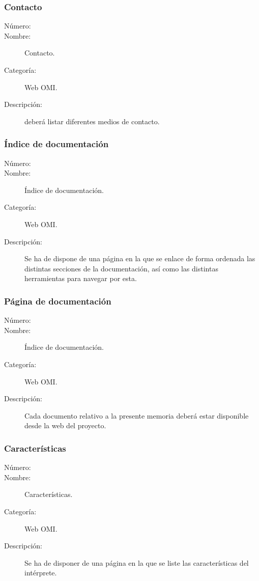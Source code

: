 \subsubsection{Contacto}
\begin{framed}
	\begin{description}
		\item [Número:] \cn
		\item [Nombre:] Contacto.
		\item [Categoría:] Web OMI.
		\item [Descripción:] deberá listar diferentes medios de contacto. 
	\end {description}
\end{framed}

\subsubsection{Índice de documentación}
\begin{framed}
	\begin{description}
		\item [Número:] \cn
		\item [Nombre:] Índice de documentación.
		\item [Categoría:] Web OMI.
		\item [Descripción:]  Se ha de dispone de una página en la que se enlace de forma ordenada las distintas secciones de la 
      documentación, así como las distintas herramientas para navegar por esta.
	\end {description}
\end{framed}

\subsubsection{Página de documentación}
\begin{framed}
	\begin{description}
		\item [Número:] \cn
		\item [Nombre:] Índice de documentación.
		\item [Categoría:] Web OMI.
		\item [Descripción:]  Cada documento relativo a la presente memoria deberá estar disponible desde la web del proyecto.
	\end {description}
\end{framed}

\subsubsection{Características}
\begin{framed}
	\begin{description}
		\item [Número:] \cn
		\item [Nombre:] Características.
		\item [Categoría:] Web OMI.
		\item [Descripción:]  Se ha de disponer de una página en la que se liste las características del intérprete.
	\end {description}
\end{framed}

